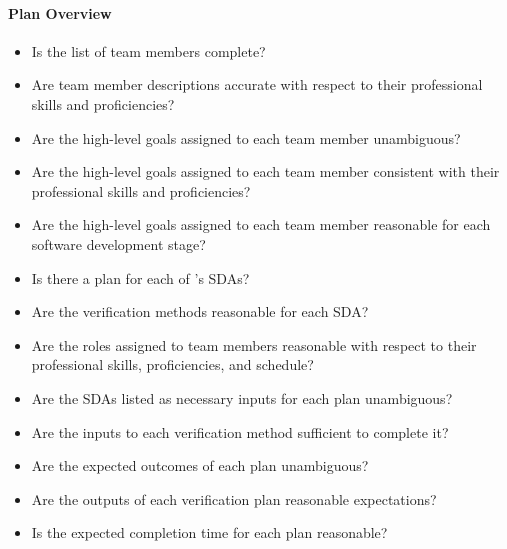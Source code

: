 \paragraph{Plan Overview}
\begin{itemize}

    \item Is the list of team members complete?

    \item Are team member descriptions accurate with respect to their
    professional skills and proficiencies?

    \item Are the high-level goals assigned to each team member unambiguous?

    \item Are the high-level goals assigned to each team member consistent with
    their professional skills and proficiencies?

    \item Are the high-level goals assigned to each team member reasonable for
    each software development stage?

    \item Is there a plan for each of \progname{}'s SDAs?

    \item Are the verification methods reasonable for each SDA?

    \item Are the roles assigned to team members reasonable with respect to
    their professional skills, proficiencies, and schedule?

    \item Are the SDAs listed as necessary inputs for each plan unambiguous?

    \item Are the inputs to each verification method sufficient to complete it?

    \item Are the expected outcomes of each plan unambiguous?

    \item Are the outputs of each verification plan reasonable expectations?

    \item Is the expected completion time for each plan reasonable?

\end{itemize}

